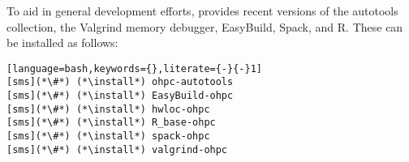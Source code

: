 To aid in general development efforts, \OHPC{} provides recent versions of the \GNU{}
autotools collection, the Valgrind memory debugger, EasyBuild, Spack, and R. These can be installed as follows:

\begin{lstlisting}[language=bash,keywords={},literate={-}{-}1]
[sms](*\#*) (*\install*) ohpc-autotools
[sms](*\#*) (*\install*) EasyBuild-ohpc
[sms](*\#*) (*\install*) hwloc-ohpc
[sms](*\#*) (*\install*) R_base-ohpc            
[sms](*\#*) (*\install*) spack-ohpc
[sms](*\#*) (*\install*) valgrind-ohpc
\end{lstlisting}
